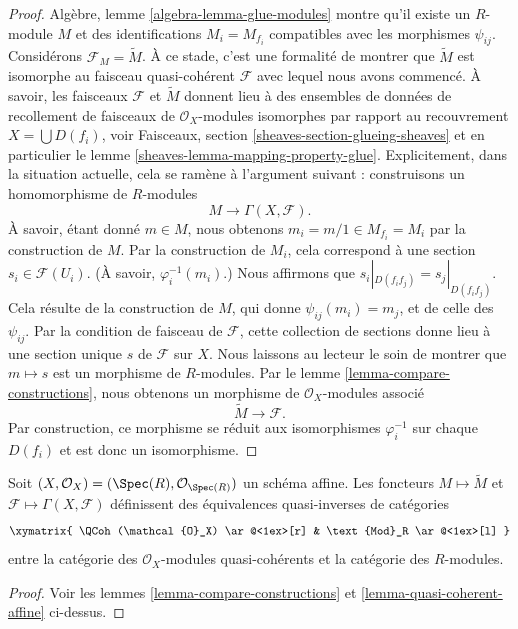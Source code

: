 \begin{proof}
\medskip\noindent
Algèbre, lemme \ref{algebra-lemma-glue-modules} montre
qu'il existe un $R$-module $M$ et des identifications $M_i
= M_{f_i}$ compatibles avec les morphismes $\psi_{ij}$. Considérons
$\mathcal{F}_M = \widetilde M$. À ce stade, c'est une formalité
de montrer que $\widetilde M$ est isomorphe au faisceau
quasi-cohérent $\mathcal{F}$ avec lequel nous avons commencé. À
savoir, les faisceaux $\mathcal{F}$ et $\widetilde M$ donnent lieu
à des ensembles de données de recollement de faisceaux de $\mathcal{O}_X$-modules
isomorphes par rapport au recouvrement $X = \bigcup D(f_i)$,
voir Faisceaux, section \ref{sheaves-section-glueing-sheaves}
et en particulier le lemme \ref{sheaves-lemma-mapping-property-glue}.
Explicitement, dans la situation actuelle, cela se ramène à
l'argument suivant : construisons un homomorphisme de $R$-modules
$$
M \longrightarrow \Gamma(X, \mathcal{F}).
$$
À savoir, étant donné $m \in M$, nous obtenons $m_i = m/1 \in M_{f_i}
= M_i$ par la construction de $M$. Par la construction de $M_i$, cela
correspond à une section $s_i \in \mathcal{F}(U_i)$. (À savoir, $\varphi^{-1}_i(m_i)$.)
Nous affirmons que $s_i|_{D(f_if_j)} = s_j|_{D(f_if_j)}$.
Cela résulte de la construction de $M$, qui donne $\psi_{ij}(m_i) = m_j$, et
de celle des $\psi_{ij}$. Par la condition de faisceau de $\mathcal{F}$,
cette collection de sections donne lieu à une section unique $s$ de
$\mathcal{F}$ sur $X$. Nous laissons au lecteur le soin de montrer que $m
\mapsto s$ est un morphisme de $R$-modules. Par le
lemme \ref{lemma-compare-constructions}, nous obtenons un morphisme de
$\mathcal{O}_X$-modules associé
$$
\widetilde M \longrightarrow \mathcal{F}.
$$
Par construction, ce morphisme se réduit aux isomorphismes
$\varphi_i^{-1}$ sur chaque $D(f_i)$ et est donc un isomorphisme.
\end{proof}

\begin{lemma}
\label{lemma-equivalence-quasi-coherent}
Soit $(X, \mathcal{O}_X) = (\Spec(R), \mathcal{O}_{\Spec(R)})$ un
schéma affine. Les
foncteurs $M \mapsto \widetilde M$ et $\mathcal{F}
\mapsto \Gamma(X, \mathcal{F})$ définissent des équivalences
quasi-inverses de catégories
$$
\xymatrix{
\QCoh(\mathcal{O}_X)
\ar@<1ex>[r]
&
\text{Mod}_R
\ar@<1ex>[l]
}
$$
entre la catégorie des $\mathcal{O}_X$-modules quasi-cohérents
et la catégorie des $R$-modules.
\end{lemma}

\begin{proof}
Voir les lemmes \ref{lemma-compare-constructions}
et \ref{lemma-quasi-coherent-affine} ci-dessus.
\end{proof}

